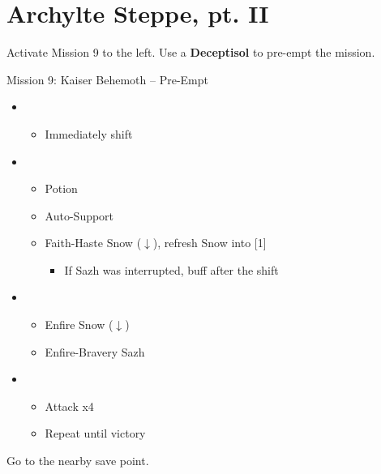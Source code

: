 \chapter{Archylte Steppe, pt. II}

Activate Mission 9 to the left.
Use a \textbf{Deceptisol} to pre-empt the mission.

\begin{battle}{Mission 9: Kaiser Behemoth -- Pre-Empt}
	\begin{itemize}
		\item \sixth
			\begin{itemize}
				\item Immediately shift
			\end{itemize}
		\item \fourth
			\begin{itemize}
				\item Potion
				\item Auto-Support
				\item Faith-Haste Snow ($\downarrow$), refresh Snow into [1]
					\begin{itemize}
						\item If Sazh was interrupted, buff after the shift
					\end{itemize}
			\end{itemize}
		\item \first
			\begin{itemize}
				\item Enfire Snow ($\downarrow$)
				\item Enfire-Bravery Sazh
			\end{itemize}
		\item \fifth
			\begin{itemize}
				\item Attack x4
				\item Repeat until victory
			\end{itemize}
	\end{itemize}
\end{battle}
Go to the nearby save point.
\vfill
